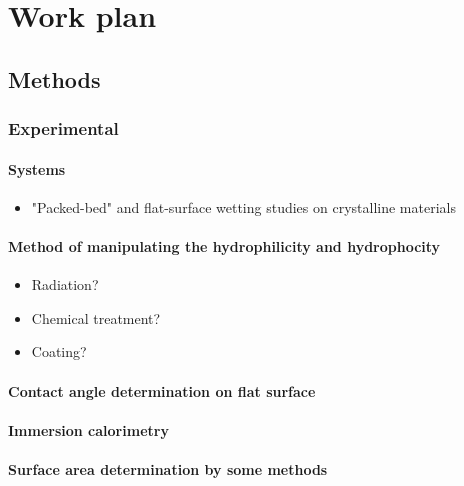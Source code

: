 \documentclass[a4paper,12pt,single,pdftex]{scrartcl}
\begin{document}
\label{ID_1615838882}\section{Work plan}

\label{ID_1509493354}\subsection{Methods}

\label{ID_176697614}\subsubsection{Experimental}

\label{ID_222214319}\paragraph{Systems}

\begin{itemize}
\label{ID_890750199}\item "Packed-bed" and flat-surface wetting studies on crystalline materials
\end{itemize}
\label{ID_890750199}\label{ID_1528992532}\paragraph{Method of manipulating the hydrophilicity and hydrophocity}

\begin{itemize}
\label{ID_630039349}\item Radiation?
\label{ID_1162892636}\item Chemical treatment?
\label{ID_1113661769}\item Coating?
\end{itemize}
\label{ID_630039349}\label{ID_1162892636}\label{ID_1113661769}\label{ID_768785223}\paragraph{Contact angle determination on flat surface}

\label{ID_1121131843}\paragraph{Immersion calorimetry}

\label{ID_627706002}\paragraph{Surface area determination by some methods}
\end{document}
